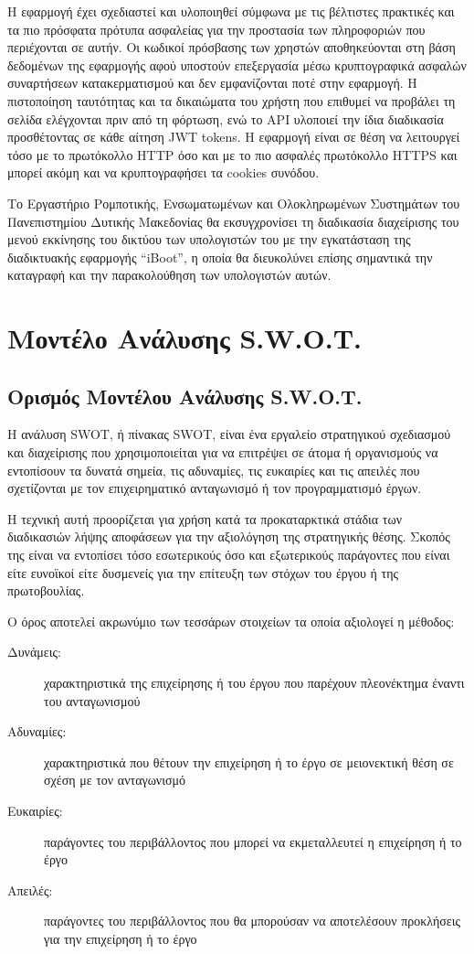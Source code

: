 Η εφαρμογή έχει σχεδιαστεί και υλοποιηθεί σύμφωνα με τις βέλτιστες πρακτικές και τα πιο πρόσφατα πρότυπα ασφαλείας για την προστασία των πληροφοριών που περιέχονται σε αυτήν. Οι κωδικοί πρόσβασης των χρηστών αποθηκεύονται στη βάση δεδομένων της εφαρμογής αφού υποστούν επεξεργασία μέσω κρυπτογραφικά ασφαλών συναρτήσεων κατακερματισμού και δεν εμφανίζονται ποτέ στην εφαρμογή. Η πιστοποίηση ταυτότητας και τα δικαιώματα του χρήστη που επιθυμεί να προβάλει τη σελίδα ελέγχονται πριν από τη φόρτωση, ενώ το API υλοποιεί την ίδια διαδικασία προσθέτοντας σε κάθε αίτηση JWT tokens. Η εφαρμογή είναι σε θέση να λειτουργεί τόσο με το πρωτόκολλο HTTP όσο και με το πιο ασφαλές πρωτόκολλο HTTPS και μπορεί ακόμη και να κρυπτογραφήσει τα cookies συνόδου.

Το Εργαστήριο Ρομποτικής, Ενσωματωμένων και Ολοκληρωμένων Συστημάτων του Πανεπιστημίου Δυτικής Μακεδονίας θα εκσυγχρονίσει τη διαδικασία διαχείρισης του μενού εκκίνησης του δικτύου των υπολογιστών του με την εγκατάσταση της διαδικτυακής εφαρμογής ``iBoot'', η οποία θα διευκολύνει επίσης σημαντικά την καταγραφή και την παρακολούθηση των υπολογιστών αυτών.

\section{Μοντέλο Ανάλυσης S.W.O.T.}

\subsection{Ορισμός Μοντέλου Ανάλυσης S.W.O.T.}
Η ανάλυση SWOT, ή πίνακας SWOT, είναι ένα εργαλείο στρατηγικού σχεδιασμού και διαχείρισης που χρησιμοποιείται για να επιτρέψει σε άτομα ή οργανισμούς να εντοπίσουν τα δυνατά σημεία, τις αδυναμίες, τις ευκαιρίες και τις απειλές που σχετίζονται με τον επιχειρηματικό ανταγωνισμό ή τον προγραμματισμό έργων.

Η τεχνική αυτή προορίζεται για χρήση κατά τα προκαταρκτικά στάδια των διαδικασιών λήψης αποφάσεων για την αξιολόγηση της στρατηγικής θέσης. Σκοπός της είναι να εντοπίσει τόσο εσωτερικούς όσο και εξωτερικούς παράγοντες που είναι είτε ευνοϊκοί είτε δυσμενείς για την επίτευξη των στόχων του έργου ή της πρωτοβουλίας.

Ο όρος αποτελεί ακρωνύμιο των τεσσάρων στοιχείων τα οποία αξιολογεί η μέθοδος:

\begin{description}
	\item[Δυνάμεις:] χαρακτηριστικά της επιχείρησης ή του έργου που παρέχουν πλεονέκτημα έναντι του ανταγωνισμού
	\item[Αδυναμίες:] χαρακτηριστικά που θέτουν την επιχείρηση ή το έργο σε μειονεκτική θέση σε σχέση με τον ανταγωνισμό
	\item[Ευκαιρίες:] παράγοντες του περιβάλλοντος που μπορεί να εκμεταλλευτεί η επιχείρηση ή το έργο
	\item[Απειλές:] παράγοντες του περιβάλλοντος που θα μπορούσαν να αποτελέσουν προκλήσεις για την επιχείρηση ή το έργο
\end{description}


